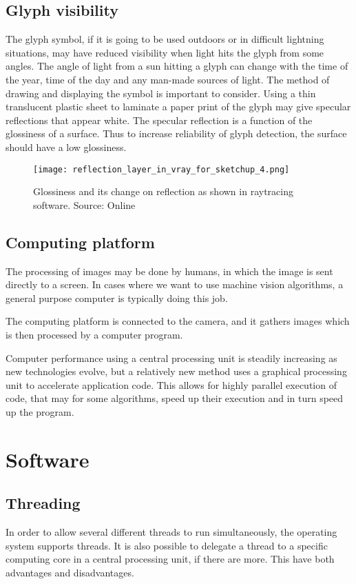 \subsection{Glyph visibility}
The glyph symbol, if it is going to be used outdoors or in difficult lightning situations, may have reduced visibility when light hits the glyph from some angles. The angle of light from a sun hitting a glyph can change with the time of the year, time of the day and any man-made sources of light. The method of drawing and displaying the symbol is important to consider.
Using a thin translucent plastic sheet to laminate a paper print of the glyph may give specular reflections that appear white. The specular reflection is a function of the glossiness of a surface. Thus to increase reliability of glyph detection, the surface should have a low glossiness.

\begin{figure}[ht]
    \centering
    \texttt{[image: reflection\_layer\_in\_vray\_for\_sketchup\_4.png]}
    \caption{Glossiness and its change on reflection as shown in raytracing software. Source: Online \citet{gloss15}}
    \label{fig:reflection_layer_in_vray_for_sketchup_4}
\end{figure}
\FloatBarrier

\subsection{Computing platform}
The processing of images may be done by humans, in which the image is sent directly to a screen. In cases where we want to use machine vision algorithms, a general purpose computer is typically doing this job.

The computing platform is connected to the camera, and it gathers images which is then processed by a computer program.

Computer performance using a central processing unit is steadily increasing as new technologies evolve, but a relatively new method uses a graphical processing unit to accelerate application code. This allows for highly parallel execution of code, that may for some algorithms, speed up their execution and in turn speed up the program.

\section{Software}
\subsection{Threading}
In order to allow several different threads to run simultaneously, the operating system supports threads. It is also possible to delegate a thread to a specific computing core in a central processing unit, if there are more. This have both advantages and disadvantages.

